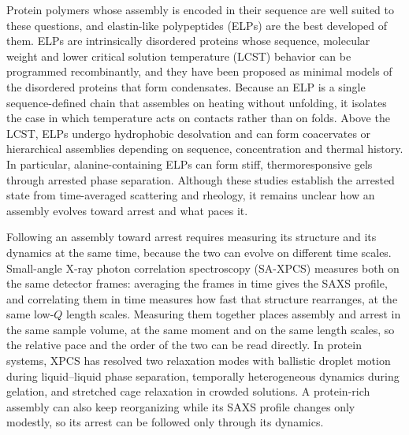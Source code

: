 \documentclass[journal=nalefd,manuscript=letter,layout=traditional]{achemso}
\begin{document}
Protein polymers whose assembly is encoded in their sequence are well suited to these questions, and elastin-like polypeptides (ELPs) are the best developed of them. ELPs are intrinsically disordered proteins whose sequence, molecular weight and lower critical solution temperature (LCST) behavior can be programmed recombinantly,\cite{Meyer2004-zb,Amiram2011-la,Quiroz2015-mh,Varanko2020-ek,Saha2020-jg} and they have been proposed as minimal models of the disordered proteins that form condensates.\cite{Roberts2015-febs,Dzuricky2018-bk} Because an ELP is a single sequence-defined chain that assembles on heating without unfolding, it isolates the case in which temperature acts on contacts rather than on folds. Above the LCST, ELPs undergo hydrophobic desolvation and can form coacervates or hierarchical assemblies depending on sequence, concentration and thermal history.\cite{Varanko2020-ek,Saha2020-jg,Sing2017-zq} In particular, alanine-containing ELPs can form stiff, thermoresponsive gels through arrested phase separation.\cite{Glassman2015-cw,Glassman2016-pq} Although these studies establish the arrested state from time-averaged scattering and rheology, it remains unclear how an assembly evolves toward arrest and what paces it.

Following an assembly toward arrest requires measuring its structure and its dynamics at the same time, because the two can evolve on different time scales. Small-angle X-ray photon correlation spectroscopy (SA-XPCS) measures both on the same detector frames: averaging the frames in time gives the SAXS profile, and correlating them in time measures how fast that structure rearranges, at the same low-$Q$ length scales. Measuring them together places assembly and arrest in the same sample volume, at the same moment and on the same length scales, so the relative pace and the order of the two can be read directly. In protein systems, XPCS has resolved two relaxation modes with ballistic droplet motion during liquid--liquid phase separation,\cite{Girelli2021-zz} temporally heterogeneous dynamics during gelation,\cite{Begam2021-fh} and stretched cage relaxation in crowded solutions.\cite{Chushkin2022-bw} A protein-rich assembly can also keep reorganizing while its SAXS profile changes only modestly,\cite{Sing2018-er,Tanaka2000-qq} so its arrest can be followed only through its dynamics.
\end{document}

